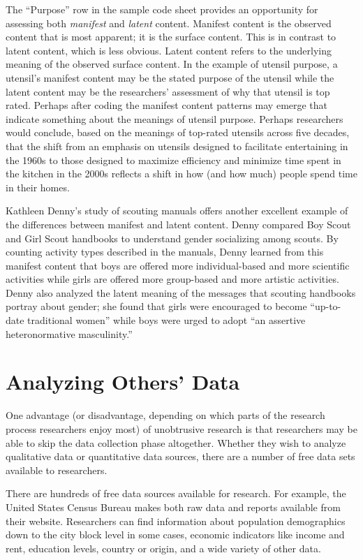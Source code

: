 The ``Purpose'' row in the sample code sheet provides an opportunity for assessing both \textit{manifest} and \textit{latent} content. Manifest content is the observed content that is most apparent; it is the surface content. This is in contrast to latent content, which is less obvious. Latent content refers to the underlying meaning of the observed surface content. In the example of utensil purpose, a utensil's manifest content may be the stated purpose of the utensil while the latent content may be the researchers' assessment of why that utensil is top rated. Perhaps after coding the manifest content patterns may emerge that indicate something about the meanings of utensil purpose. Perhaps researchers would conclude, based on the meanings of top-rated utensils across five decades, that the shift from an emphasis on utensils designed to facilitate entertaining in the 1960s to those designed to maximize efficiency and minimize time spent in the kitchen in the 2000s reflects a shift in how (and how much) people spend time in their homes.

Kathleen Denny's\cite{denny2011gender} study of scouting manuals offers another excellent example of the differences between manifest and latent content. Denny compared Boy Scout and Girl Scout handbooks to understand gender socializing among scouts. By counting activity types described in the manuals, Denny learned from this manifest content that boys are offered more individual-based and more scientific activities while girls are offered more group-based and more artistic activities. Denny also analyzed the latent meaning of the messages that scouting handbooks portray about gender; she found that girls were encouraged to become ``up-to-date traditional women'' while boys were urged to adopt ``an assertive heteronormative masculinity.''

\section{Analyzing Others' Data}

One advantage (or disadvantage, depending on which parts of the research process researchers enjoy most) of unobtrusive research is that researchers may be able to skip the data collection phase altogether. Whether they wish to analyze qualitative data or quantitative data sources, there are a number of free data sets available to researchers.

There are hundreds of free data sources available for research. For example, the United States Census Bureau makes both raw data and reports available from their website. Researchers can find information about population demographics down to the city block level in some cases, economic indicators like income and rent, education levels, country or origin, and a wide variety of other data. 

